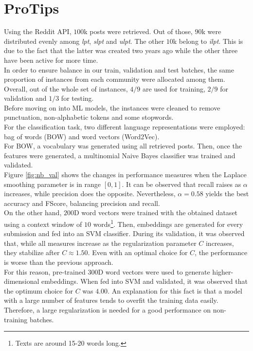 \documentclass[11pt,a4paper]{article}
\begin{document}
\section{ProTips}
\label{sec:protips}
Using the Reddit API, $100$k posts were retrieved. Out of those, $90$k were distributed
evenly among \textit{lpt}, \textit{slpt} and \textit{ulpt}. The other $10$k belong to
\textit{ilpt}. This is due to the fact that the latter was created two years ago
while the other three have been active for more time.\\
In order to ensure balance in our train, validation and test batches, the same proportion
of instances from each community were allocated among them.\\
Overall, out of the whole set of instances, $4/9$ are used for training, $2/9$ for
validation and $1/3$ for testing.\\
Before moving on into ML models, the instances were cleaned to remove punctuation,
non-alphabetic tokens and some stopwords.\\

For the classification task, two different language representations were employed: bag
of words (BOW) and word vectors (Word2Vec).\\
For BOW, a vocabulary was generated using all retrieved posts. Then, once the features
were generated, a multinomial Naive Bayes classifier was trained and validated.\\
Figure \ref{fig:nb_val} shows the changes in performance measures when the Laplace
smoothing parameter is in range $[0, 1]$. It can be observed that recall raises as
$\alpha$ increases, while precision does the opposite. Nevertheless, $\alpha = 0.58$
yields the best accuracy and FScore, balancing precision and recall.\\
On the other hand, $200$D word vectors were trained with the obtained dataset using
a context window of $10$ words\footnote{Texts are around 15-20 words long.}.
Then, embeddings are generated for every submission and fed into an SVM classifier.
During its validation, it was observed that, while all measures increase as the
regularization parameter $C$ increases, they stabilize after $C \approx 	1.50$. Even
with an optimal choice for $C$, the performance is worse than the previous approach.\\
For this reason, pre-trained $300$D word vectors were used to generate
higher-dimensional embeddings. When fed into SVM and validated, it was observed that
the optimum choice for $C$ was $4.00$. An explanation for this fact is that a model with
a large number of features tends to overfit the training data easily. Therefore, a large
regularization is needed for a good performance on non-training batches.\\
\end{document}
